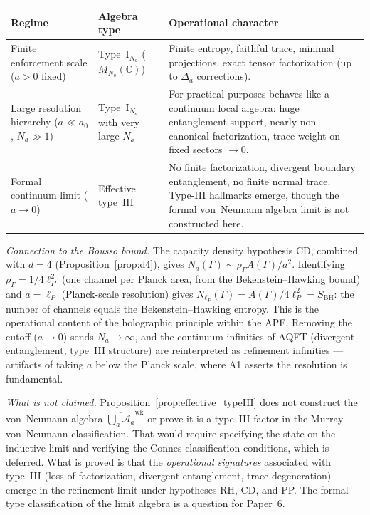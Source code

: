 \documentclass[11pt,a4paper]{article}
\theoremstyle{definition}
\begin{document}
\begin{center}\small
\renewcommand{\arraystretch}{1.15}
\begin{tabular}{@{}p{3.0cm}p{3.5cm}p{5.5cm}@{}}
\toprule
\textbf{Regime} & \textbf{Algebra type} & \textbf{Operational character} \\
\midrule
Finite enforcement scale ($a > 0$ fixed) &
  Type~I$_{N_a}$ ($M_{N_a}(\mathbb{C})$) &
  Finite entropy, faithful trace, minimal projections, exact
  tensor factorization (up to $\Delta_a$ corrections). \\[3pt]
Large resolution hierarchy ($a \ll a_0$, $N_a \gg 1$) &
  Type~I$_{N_a}$ with very large $N_a$ &
  For practical purposes behaves like a continuum local algebra:
  huge entanglement support, nearly non-canonical factorization,
  trace weight on fixed sectors $\to 0$. \\[3pt]
Formal continuum limit ($a \to 0$) &
  Effective type~III &
  No finite factorization, divergent boundary entanglement, no
  finite normal trace.  Type-III hallmarks emerge, though the
  formal von~Neumann algebra limit is not constructed here. \\
\bottomrule
\end{tabular}
\end{center}

\smallskip\noindent\textit{Connection to the Bousso bound.}\quad
The capacity density hypothesis CD, combined with $d = 4$
(Proposition~\ref{prop:d4}), gives
$N_a(\Gamma) \sim \rho_\Gamma A(\Gamma) / a^2$.  Identifying
$\rho_\Gamma = 1 / 4\ell_P^2$ (one channel per Planck area, from
the Bekenstein--Hawking bound) and $a = \ell_P$ (Planck-scale
resolution) gives
$N_{\ell_P}(\Gamma) = A(\Gamma) / 4\ell_P^2 = S_{\mathrm{BH}}$:
the number of channels equals the Bekenstein--Hawking entropy.  This
is the operational content of the holographic principle within the
APF.  Removing the cutoff ($a \to 0$) sends
$N_a \to \infty$, and the continuum infinities of AQFT (divergent
entanglement, type~III structure) are reinterpreted as refinement
infinities --- artifacts of taking $a$ below the Planck scale, where
A1 asserts the resolution is fundamental.

\smallskip\noindent\textit{What is not claimed.}\quad
Proposition~\ref{prop:effective_typeIII} does not construct the
von~Neumann algebra $\overline{\bigcup_a \mathcal{A}_a}^{\mathrm{wk}}$
or prove it is a type~III factor in the Murray--von~Neumann
classification.  That would require specifying the state on the
inductive limit and verifying the Connes classification conditions,
which is deferred.  What is proved is that the \emph{operational
signatures} associated with type~III (loss of factorization, divergent
entanglement, trace degeneration) emerge in the refinement limit under
hypotheses RH, CD, and PP.  The formal type classification of the
limit algebra is a question for Paper~6.
\end{document}
